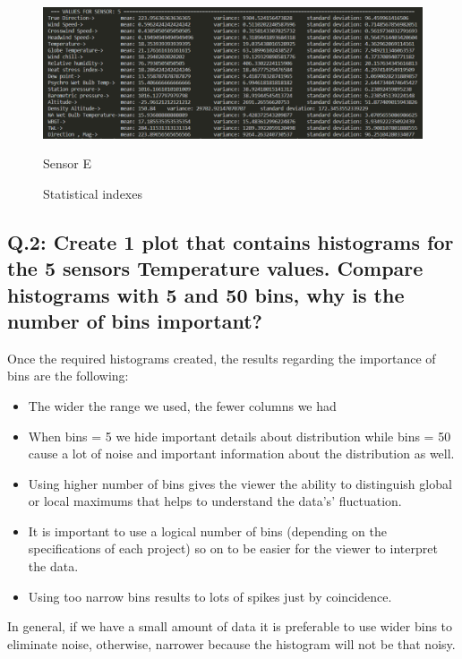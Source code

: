 \documentclass[a4paper]{article}
\begin{document}
        \begin{figure}[H]
            \centering
            \includegraphics[width=\textwidth]{images/sensor_5.PNG}
            \caption{Sensor E}
            \caption{Statistical indexes}
            
        \end{figure}


    \subsection{Q.2: Create 1 plot that contains histograms for the 5 sensors Temperature values. Compare histograms with 5 and 50 bins, why is the number of bins important?}
    
        Once the required histograms created, the results regarding the importance of bins are the following: 
        \begin{itemize}
            \item The wider the range we used, the fewer columns we had
            \item When bins = 5 we hide important details about distribution while bins = 50 cause a lot of noise and important information about the distribution as well.
            \item Using higher number of bins gives the viewer the ability to distinguish global or local maximums that helps to understand the data’s’ fluctuation.
            \item It is important to use a logical number of bins (depending on the specifications of each project) so on to be easier for the viewer to interpret the data. 
            \item Using too narrow bins results to lots of spikes just by coincidence.
        \end{itemize}

        In general, if we have a small amount of data it is preferable to use wider bins to eliminate noise, otherwise, narrower because the histogram will not be that noisy.
\end{document}
